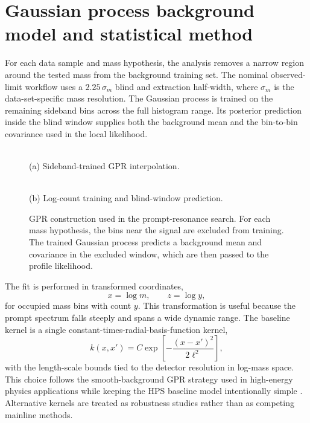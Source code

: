 \section{Gaussian process background model and statistical method}
\label{sec:gpr-stats}

For each data sample and mass hypothesis, the analysis removes a narrow region around
the tested mass from the background training set. The nominal observed-limit workflow
uses a $2.25\,\sigma_m$ blind and extraction half-width, where $\sigma_m$ is the
data-set-specific mass resolution. The Gaussian process is trained on the remaining
sideband bins across the full histogram range. Its posterior prediction inside the
blind window supplies both the background mean and the bin-to-bin covariance used in
the local likelihood.

\begin{figure}[t]
\centering
\begin{minipage}{0.47\textwidth}
\centering
{}\\
(a) Sideband-trained GPR interpolation.
\end{minipage}
\hfill
\begin{minipage}{0.47\textwidth}
\centering
{}\\
(b) Log-count training and blind-window prediction.
\end{minipage}
\caption{GPR construction used in the prompt-resonance search. For each mass
hypothesis, the bins near the signal are excluded from training. The trained Gaussian
process predicts a background mean and covariance in the excluded window, which are
then passed to the profile likelihood.}
\label{fig:gpr-method}
\end{figure}

The fit is performed in transformed coordinates,
\begin{equation}
x=\log m,\qquad z=\log y,
\end{equation}
for occupied mass bins with count $y$. This transformation is useful because the
prompt spectrum falls steeply and spans a wide dynamic range. The baseline kernel is a
single constant-times-radial-basis-function kernel,
\begin{equation}
k(x,x')=C\exp\left[-\frac{(x-x')^2}{2\ell^2}\right],
\end{equation}
with the length-scale bounds tied to the detector resolution in log-mass space. This
choice follows the smooth-background GPR strategy used in high-energy physics
applications while keeping the HPS baseline model intentionally simple
\cite{RasmussenWilliams2006,FrateGP2017,Gandrakota2023,BarrLiu2025}. Alternative
kernels are treated as robustness studies rather than as competing mainline methods.

